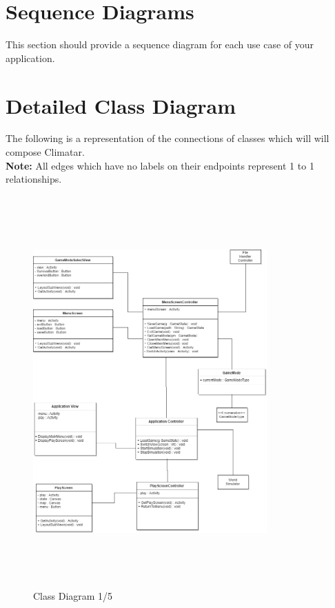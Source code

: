 \documentclass[]{article}
\begin{document}
\section{Sequence Diagrams}
\label{sec:sequence_diagrams}
This section should provide a sequence diagram for each use case of your application.
\pagebreak
\section{Detailed Class Diagram}
\label{sec:detailed_class_diagram}
The following is a representation of the connections of classes which will will compose Climatar. \\
\textbf{Note:} All edges which have no labels on their endpoints represent 1 to 1 relationships.

\begin{figure}[h]
    \centering
    \includegraphics[width=0.8\textwidth , height=15cm, keepaspectratio]{dcdTL}
    \caption{Class Diagram 1/5}
    \label{fig:dcdTL}
\end{figure}
\end{document}
